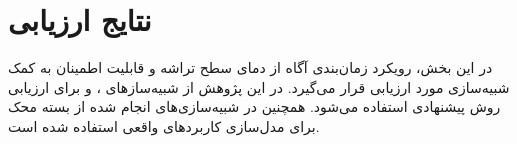 \section{نتایج ارزیابی}
در این بخش، رویکرد زمان‌بندی آگاه از دمای سطح تراشه و قابلیت اطمینان به کمک شبیه‌سازی مورد ارزیابی قرار می‌گیرد. در این پژوهش از شبیه‌سازهای 
\cite{binkert2011gem5}، \cite{li2009mcpat}
و 
\cite{huang2006hotspot}
برای ارزیابی روش پیشنهادی استفاده می‌شود.
همچنین در شبیه‌سازی‌های انجام شده از بسته محک
 \cite{guthaus2001mibench}
برای مدل‌سازی کاربردهای واقعی استفاده شده است.\\





